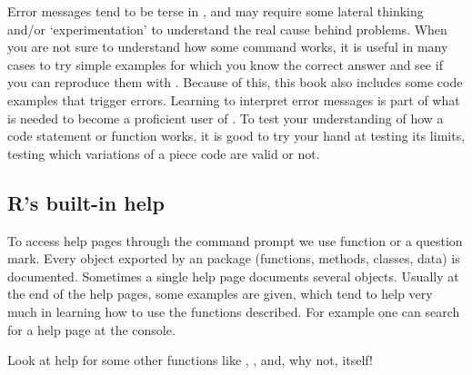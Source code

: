 \documentclass[krantz2]{krantz}\usepackage{knitr}%
\begin{document}
\begin{warningbox}
Error messages tend to be terse in \Rpgrm, and may require some lateral thinking and/or `experimentation' to understand the real cause behind problems. When you are not sure to understand how some command works, it is useful in many cases to try simple examples for which you know the correct answer and see if you can reproduce them with \Rpgrm. Because of this, this book also includes some code examples that trigger errors. Learning to interpret error messages is part of what is needed to become a proficient user of \Rlang. To test your understanding of how a code statement or function works, it is good to try your hand at testing its limits, testing which variations of a piece code are valid or not.
\end{warningbox}

\subsection{R's built-in help}

To access help pages through the command prompt we use function  or a question mark. Every object exported by an \Rlang package (functions, methods, classes, data) is documented. Sometimes a single help page documents several \Rlang objects. Usually at the end of the help pages, some examples are given, which tend to help very much in learning how to use the functions described. For example one can search for a help page at the \Rpgrm console.

\begin{knitrout}\footnotesize
{}\color{fgcolor}\begin{kframe}
\begin{alltt}
\hlstd{(}\hlstd{)}
\end{alltt}
\end{kframe}
\end{knitrout}

\begin{playground}
Look at help for some other functions like , ,  and, why not,  itself!

\begin{knitrout}\footnotesize
{}\color{fgcolor}\begin{kframe}
\begin{alltt}
\end{alltt}
\end{kframe}
\end{knitrout}
\end{playground}
\end{document}
